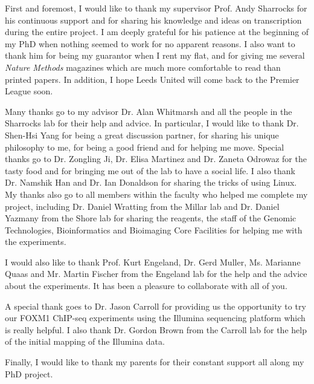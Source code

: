 \documentclass[12pt,a4paper]{report}
\begin{document}
\begin{uomacknowledgements}
First and foremost, I would like to thank my supervisor Prof. Andy Sharrocks for his continuous support and for sharing his knowledge and ideas on transcription during the entire project. I am deeply grateful for his patience at the beginning of my PhD when nothing seemed to work for no apparent reasons. I also want to thank him for being my guarantor when I rent my flat, and for giving me several \textit{Nature Methods} magazines which are much more comfortable to read than printed papers. In addition, I hope Leeds United will come back to the Premier League soon.

Many thanks go to my advisor Dr. Alan Whitmarsh and all the people in the Sharrocks lab for their help and advice. In particular, I would like to thank Dr. Shen-Hsi Yang for being a great discussion partner, for sharing his unique philosophy to me, for being a good friend and for helping me move. Special thanks go to Dr. Zongling Ji, Dr. Elisa Martinez and Dr. Zaneta Odrowaz for the tasty food and for bringing me out of the lab to have a social life. I also thank Dr. Namshik Han and Dr. Ian Donaldson for sharing the tricks of using Linux. My thanks also go to all members within the faculty who helped me complete my project, including Dr. Daniel Wratting from the Millar lab and Dr. Daniel Yazmany from the Shore lab for sharing the reagents, the staff of the Genomic Technologies, Bioinformatics and Bioimaging Core Facilities for helping me with the experiments.

I would also like to thank Prof. Kurt Engeland, Dr. Gerd Muller, Ms. Marianne Quaas and Mr. Martin Fischer from the Engeland lab for the help and the advice about the experiments. It has been a pleasure to collaborate with all of you.

A special thank goes to Dr. Jason Carroll for providing us the opportunity to try our FOXM1 ChIP-seq experiments using the Illumina sequencing platform which is really helpful. I also thank Dr. Gordon Brown from the Carroll lab for the help of the initial mapping of the Illumina data.

Finally, I would like to thank my parents for their constant support all along my PhD project.
\end{uomacknowledgements}














\appendix


%
%

\setlength\bibitemsep{4pt}
\printbibliography[title={Reference},heading=bibintoc]
\end{document}
